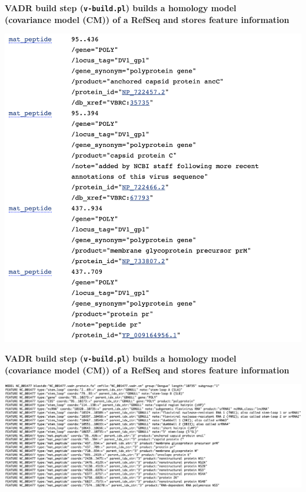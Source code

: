 \documentclass[landscape]{slides}
\begin{document}
\begin{slide}
\begin{center}
\textbf{VADR build step (\texttt{v-build.pl}) builds a homology model
  \\ (covariance model (CM)) of a RefSeq and stores feature information}

\includegraphics[width=6in]{figs/ss-001477-bot}

\end{center}
\vfill
\end{slide}
\begin{slide}
\begin{center}
\textbf{VADR build step (\texttt{v-build.pl}) builds a homology model
  \\ (covariance model (CM)) of a RefSeq and stores feature information}

\includegraphics[width=10.5in]{figs/ss-001477-minfo}

\end{center}
\vfill
\end{slide}
\end{document}
